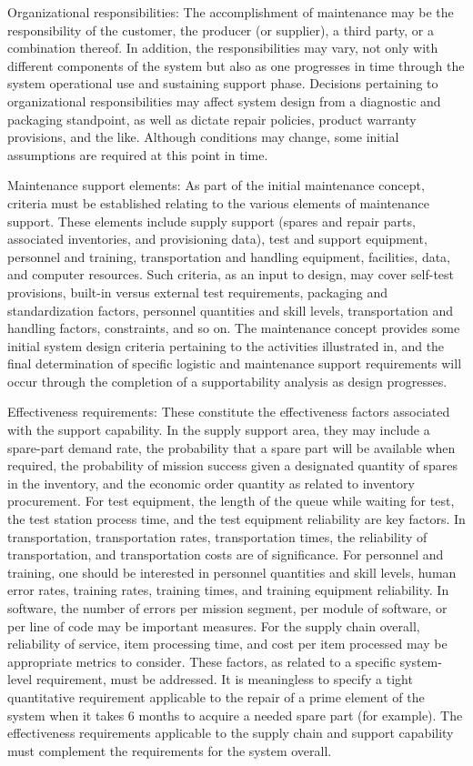 Organizational responsibilities: The accomplishment of maintenance may be the responsibility of the customer, the producer (or supplier), a third party, or a combination thereof. In addition, the responsibilities may vary, not only with different components of the system but also as one progresses in time through the system operational use and sustaining support phase. Decisions pertaining to organizational responsibilities may affect system design from a diagnostic and packaging standpoint, as well as dictate repair policies, product warranty provisions, and the like. Although conditions may change, some initial assumptions are required at this point in time.

Maintenance support elements: As part of the initial maintenance concept, criteria must be established relating to the various elements of maintenance support. These elements include supply support (spares and repair parts, associated inventories, and provisioning data), test and support equipment, personnel and training, transportation and handling equipment, facilities, data, and computer resources. Such criteria, as an input to design, may cover self-test provisions, built-in versus external test requirements, packaging and standardization factors, personnel quantities and skill levels, transportation and handling factors, constraints, and so on. The maintenance concept provides some initial system design criteria pertaining to the activities illustrated in, and the final determination of specific logistic and maintenance support requirements will occur through the completion of a supportability analysis as design progresses.

Effectiveness requirements: These constitute the effectiveness factors associated with the support capability. In the supply support area, they may include a spare-part demand rate, the probability that a spare part will be available when required, the probability of mission success given a designated quantity of spares in the inventory, and the economic order quantity as related to inventory procurement. For test equipment, the length of the queue while waiting for test, the test station process time, and the test equipment reliability are key factors. In transportation, transportation rates, transportation times, the reliability of transportation, and transportation costs are of significance. For personnel and training, one should be interested in personnel quantities and skill levels, human error rates, training rates, training times, and training equipment reliability. In software, the number of errors per mission segment, per module of software, or per line of code may be important measures. For the supply chain overall, reliability of service, item processing time, and cost per item processed may be appropriate metrics to consider. These factors, as related to a specific system-level requirement, must be addressed. It is meaningless to specify a tight quantitative requirement applicable to the repair of a prime element of the system when it takes 6 months to acquire a needed spare part (for example). The effectiveness requirements applicable to the supply chain and support capability must complement the requirements for the system overall.

